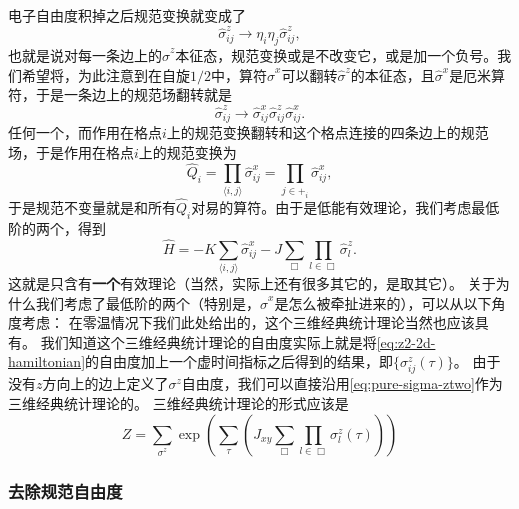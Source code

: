 \documentclass[hyperref, UTF8, a4paper]{ctexart}
\newcommand*{\pair}[1]{\langle #1 \rangle}
\renewcommand{\emph}[1]{\textbf{#1}}
\newcommand*{\Ztwo}{$\mathbb{Z}_2$}
\begin{document}
电子自由度积掉之后规范变换就变成了
\begin{equation}
    \hat{\sigma}_{ij}^z \longrightarrow \eta_i \eta_j \hat{\sigma}_{ij}^z,
    \label{eq:pure-sigma-ztwo}
\end{equation}
也就是说对每一条边上的$\hat{\sigma}^z$本征态，规范变换或是不改变它，或是加一个负号。我们希望将，为此注意到在自旋$1/2$中，算符$\hat{\sigma}^x$可以翻转$\hat{\sigma}^z$的本征态，且$\hat{\sigma}^x$是厄米算符，于是一条边上的规范场翻转就是
\[
    \hat{\sigma}_{ij}^z \longrightarrow \hat{\sigma}^x_{ij} \hat{\sigma}_{ij}^z \hat{\sigma}^x_{ij}.
\]
任何一个，而作用在格点$i$上的规范变换翻转和这个格点连接的四条边上的规范场，于是作用在格点$i$上的规范变换为
\begin{equation}
    \hat{Q}_i = \prod_{\pair{i, j}} \hat{\sigma}^x_{ij} = \prod_{j \in +_i} \hat{\sigma}^x_{ij},
    \label{eq:z2-charge}
\end{equation}
于是规范不变量就是和所有$\hat{Q}_i$对易的算符。由于是低能有效理论，我们考虑最低阶的两个，得到
\begin{equation}
    \hat{H} = - K \sum_{\pair{i, j}} \hat{\sigma}^x_{ij} - J \sum_{\Box} \prod_{l \in \Box} \hat{\sigma}^z_{l}.
    \label{eq:z2-2d-hamiltonian}
\end{equation}
这就是只含有\emph{一个}有效理论（当然，实际上还有很多其它的，是取其它）。
关于为什么我们考虑了最低阶的两个（特别是，$\hat{\sigma}^x$是怎么被牵扯进来的），可以从以下角度考虑：
在零温情况下我们此处给出的，这个三维经典统计理论当然也应该具有。
我们知道这个三维经典统计理论的自由度实际上就是将\eqref{eq:z2-2d-hamiltonian}的自由度加上一个虚时间指标之后得到的结果，即$\{\sigma^z_{ij}(\tau)\}$。
由于没有$z$方向上的边上定义了$\sigma^z$自由度，我们可以直接沿用\eqref{eq:pure-sigma-ztwo}作为三维经典统计理论的。
三维经典统计理论的形式应该是
\[
    Z = \sum_{\sigma^z} \exp(\sum_{\tau} (J_{xy} \sum_{\Box} \prod_{l \in \Box} \sigma_l^z(\tau)  ) )
\]

\subsubsection{去除规范自由度}
\end{document}
